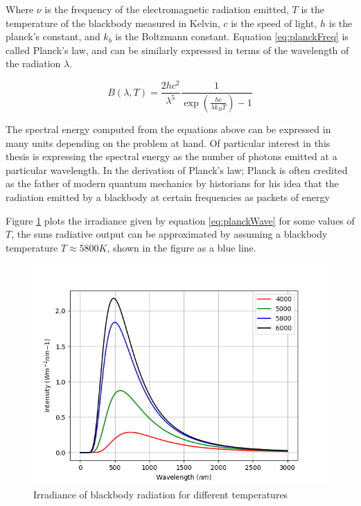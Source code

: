 Where $\nu$ is the frequency of the electromagnetic radiation emitted, $T$ is the temperature of the blackbody measured in Kelvin, $c$ is the speed of light, $h$ is the planck's constant, and $k_b$ is the Boltzmann constant. Equation \ref{eq:planckFreq} is called Planck's law, and can be similarly expressed in terms of the wavelength of the radiation $\lambda$.

\begin{equation}\label{eq:planckWave}
    B(\lambda, T) = \frac{2 h c^2}{\lambda^5} \frac{1}{\exp(\frac{hc}{\lambda k_B T}) - 1}
\end{equation}

The spectral energy computed from the equations above can be expressed in many units depending on the problem at hand. Of particular interest in this thesis is expressing the spectral energy as the number of photons emitted at a particular wavelength. In the derivation of Planck's law; Planck is often credited as the father of modern quantum mechanics by historians for his idea that the radiation emitted by a blackbody at certain frequencies as packets of energy 

Figure \ref{fig:blackbody} plots the irradiance given by equation \ref{eq:planckWave} for some values of $T$, the suns radiative output can be approximated by assuming a blackbody temperature $T \approx 5800 K$, shown in the figure as a blue line.

\begin{figure}[h!]
    \centering
    \includegraphics[scale=0.6]{figures/blackbody.png}
    \caption{Irradiance of blackbody radiation for different temperatures}
    \label{fig:blackbody}
\end{figure}


